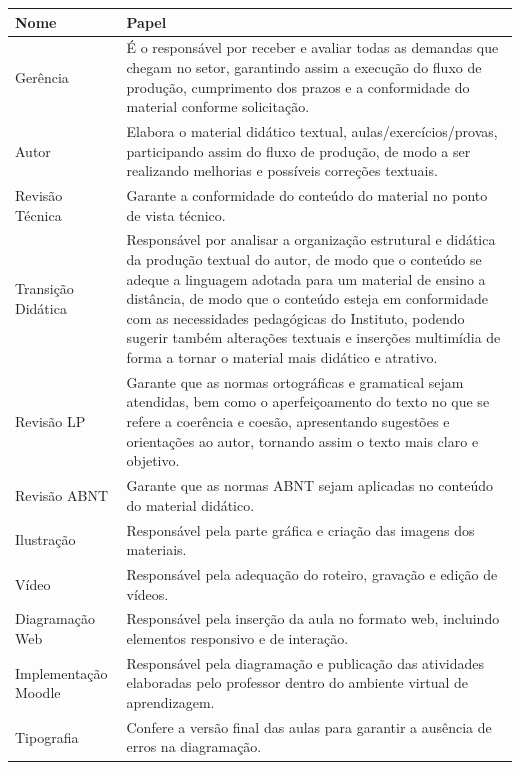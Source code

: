 \begin{center}
\begin{tabular}{|p{3cm}|p{11cm}|}
\hline            
\rowcolor[HTML]{EFEFEF}      
\textbf{Nome} & \textbf{Papel} \\ \hline
Gerência & É o responsável por receber e avaliar todas as demandas que chegam no setor, garantindo assim a execução do fluxo de produção, cumprimento dos prazos e a conformidade do material conforme solicitação.
\\ \hline 
Autor & Elabora o material didático textual, aulas/exercícios/provas, participando assim do fluxo de produção, de modo a ser realizando melhorias e possíveis correções textuais.             
\\ \hline 
Revisão Técnica & Garante a conformidade do conteúdo do material no ponto de vista técnico.
\\ \hline 
Transição Didática & Responsável por analisar a organização estrutural e didática da produção textual do autor, de modo que o conteúdo se adeque a linguagem adotada para um material de ensino a distância, de modo que o conteúdo esteja em conformidade com as necessidades pedagógicas do Instituto, podendo sugerir também alterações textuais e inserções multimídia de forma a tornar o material mais didático e atrativo.
\\ \hline                                                                                               
Revisão LP & Garante que as normas ortográficas e gramatical sejam atendidas, bem como o aperfeiçoamento do texto no que se refere a coerência e coesão, apresentando sugestões e orientações ao autor, tornando assim o texto mais claro e objetivo.
\\ \hline 
Revisão ABNT & Garante que as normas ABNT sejam aplicadas no conteúdo do material didático.    
\\ \hline       
Ilustração & Responsável pela parte gráfica e criação das imagens dos materiais.  
\\ \hline           
Vídeo & Responsável pela adequação do roteiro, gravação e edição de vídeos.    
\\ \hline                                                                                                                                         
Diagramação Web & Responsável pela inserção da aula no formato web, incluindo elementos responsivo e de interação. 
\\ \hline                                                                                                
Implementação Moodle & Responsável pela diagramação e publicação das atividades elaboradas pelo professor dentro do ambiente virtual de aprendizagem.
\\ \hline
Tipografia & Confere a versão final das aulas para garantir a ausência de erros na diagramação.
\\ \hline
\end{tabular}
\end{center}

